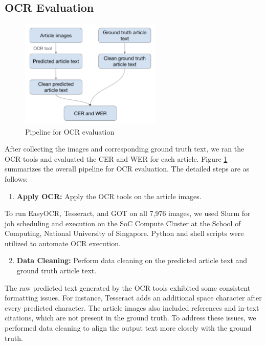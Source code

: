 \documentclass[12pt,oneside]{memoir}
\begin{document}
\subsection{OCR Evaluation} \label{section:ocr-evaluation}

\begin{figure}[ht]
    \centering
    \includegraphics[width=0.6\textwidth]{images/ocr-evaluation.png}
    \caption{Pipeline for OCR evaluation}
    \label{figure:ocr-evaluation}
\end{figure}

After collecting the images and corresponding ground truth text, we ran the OCR tools and evaluated the CER and WER for each article.
Figure \ref{figure:ocr-evaluation} summarizes the overall pipeline for OCR evaluation. The detailed steps are as follows:

\begin{enumerate}
    \item \textbf{Apply OCR:} Apply the OCR tools on the article images.
\end{enumerate}

To run EasyOCR, Tesseract, and GOT on all 7,976 images, we used Slurm for job scheduling and execution on the SoC Compute Cluster at the School of Computing, National University of Singapore. Python and shell scripts were utilized to automate OCR execution.

\begin{enumerate}
    \setcounter{enumi}{1}
    \item \textbf{Data Cleaning:} Perform data cleaning on the predicted article text and ground truth article text.
\end{enumerate}

The raw predicted text generated by the OCR tools exhibited some consistent formatting issues.
For instance, Tesseract adds an additional space character after every predicted character.
The article images also included references and in-text citations, which are not present in the ground truth.
To address these issues, we performed data cleaning to align the output text more closely with the ground truth.
\end{document}
